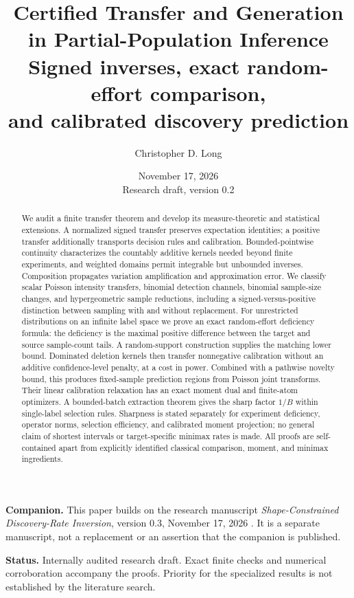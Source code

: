\documentclass[11pt]{article}
\title{\textbf{Certified Transfer and Generation\\in Partial-Population Inference}\\[5pt]
\large Signed inverses, exact random-effort comparison,\\and calibrated discovery prediction}
\author{Christopher D. Long}
\date{November 17, 2026\\[3pt]\small Research draft, version 0.2}
\numberwithin{equation}{section}
\theoremstyle{definition}
\theoremstyle{remark}
\begin{document}
\maketitle
\begin{abstract}
We audit a finite transfer theorem and develop its measure-theoretic and statistical extensions. A normalized signed transfer preserves expectation identities; a positive transfer additionally transports decision rules and calibration. Bounded-pointwise continuity characterizes the countably additive kernels needed beyond finite experiments, and weighted domains permit integrable but unbounded inverses. Composition propagates variation amplification and approximation error. We classify scalar Poisson intensity transfers, binomial detection channels, binomial sample-size changes, and hypergeometric sample reductions, including a signed-versus-positive distinction between sampling with and without replacement. For unrestricted distributions on an infinite label space we prove an exact random-effort deficiency formula: the deficiency is the maximal positive difference between the target and source sample-count tails. A random-support construction supplies the matching lower bound. Dominated deletion kernels then transfer nonnegative calibration without an additive confidence-level penalty, at a cost in power. Combined with a pathwise novelty bound, this produces fixed-sample prediction regions from Poisson joint transforms. Their linear calibration relaxation has an exact moment dual and finite-atom optimizers. A bounded-batch extraction theorem gives the sharp factor $1/B$ within single-label selection rules. Sharpness is stated separately for experiment deficiency, operator norms, selection efficiency, and calibrated moment projection; no general claim of shortest intervals or target-specific minimax rates is made. All proofs are self-contained apart from explicitly identified classical comparison, moment, and minimax ingredients.
\end{abstract}
\noindent\textbf{Companion.} This paper builds on the research manuscript \emph{Shape-Constrained Discovery-Rate Inversion}, version 0.3, November 17, 2026 \cite{LongI}. It is a separate manuscript, not a replacement or an assertion that the companion is published.\par\medskip
\noindent\textbf{Status.} Internally audited research draft. Exact finite checks and numerical corroboration accompany the proofs. Priority for the specialized results is not established by the literature search.
\clearpage\begingroup\small\tableofcontents\endgroup\clearpage
\end{document}
